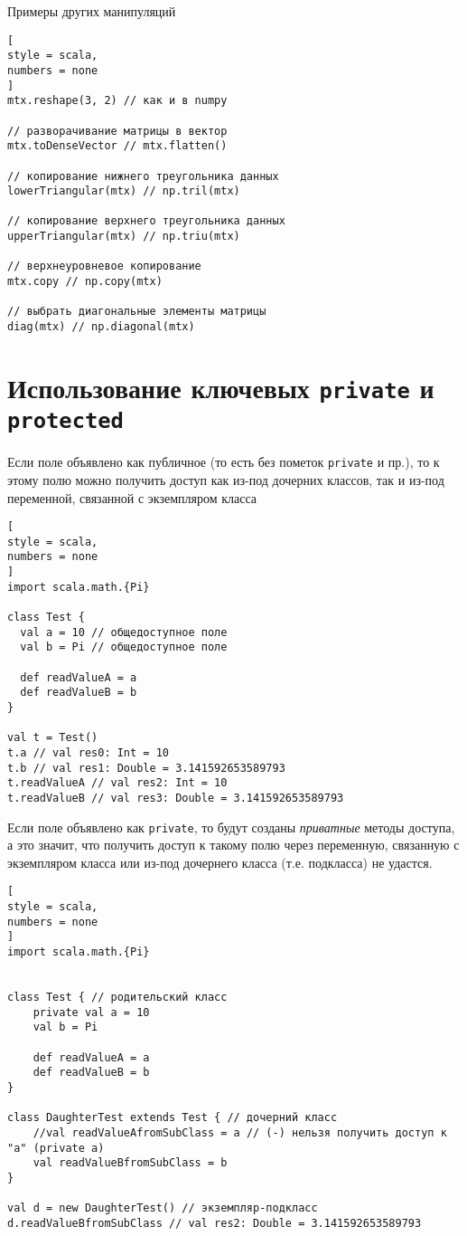 \documentclass[%
	11pt,
	a4paper,
	utf8,
		]{article}
\begin{document}
Примеры других манипуляций
\begin{lstlisting}[
style = scala,
numbers = none	
]
mtx.reshape(3, 2) // как и в numpy

// разворачивание матрицы в вектор
mtx.toDenseVector // mtx.flatten()

// копирование нижнего треугольника данных
lowerTriangular(mtx) // np.tril(mtx)

// копирование верхнего треугольника данных
upperTriangular(mtx) // np.triu(mtx)

// верхнеуровневое копирование
mtx.copy // np.copy(mtx)

// выбрать диагональные элементы матрицы
diag(mtx) // np.diagonal(mtx)
\end{lstlisting}

\section{Использование ключевых \texttt{private} и \texttt{protected}}

Если поле объявлено как публичное (то есть без пометок \texttt{private} и пр.), то к этому полю можно получить доступ как из-под дочерних классов, так и из-под переменной, связанной с экземпляром класса

\begin{lstlisting}[
style = scala,
numbers = none	
]
import scala.math.{Pi}

class Test {
  val a = 10 // общедоступное поле
  val b = Pi // общедоступное поле
  
  def readValueA = a
  def readValueB = b
}

val t = Test()
t.a // val res0: Int = 10
t.b // val res1: Double = 3.141592653589793
t.readValueA // val res2: Int = 10
t.readValueB // val res3: Double = 3.141592653589793
\end{lstlisting}

Если поле объявлено как \texttt{private}, то будут созданы \emph{приватные} методы доступа, а это значит, что получить доступ к такому полю через переменную, связанную с экземпляром класса или из-под дочернего класса (т.е. подкласса) не удастся.
\begin{lstlisting}[
style = scala,
numbers = none	
]
import scala.math.{Pi}


class Test { // родительский класс
	private val a = 10
	val b = Pi
	
	def readValueA = a
	def readValueB = b
}

class DaughterTest extends Test { // дочерний класс
	//val readValueAfromSubClass = a // (-) нельзя получить доступ к "a" (private a)
	val readValueBfromSubClass = b
}

val d = new DaughterTest() // экземпляр-подкласс
d.readValueBfromSubClass // val res2: Double = 3.141592653589793
\end{lstlisting}
\end{document}
